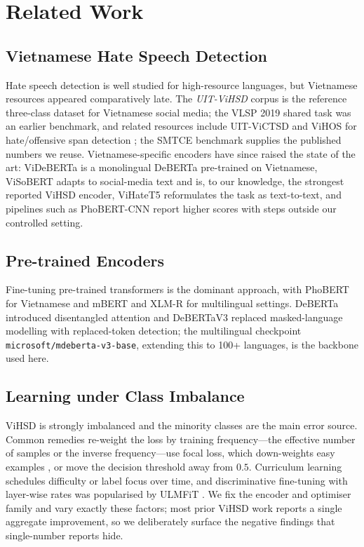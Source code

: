 \section{Related Work}
\label{sec:related}

\subsection{Vietnamese Hate Speech Detection}
Hate speech detection is well studied for high-resource languages, but Vietnamese
resources appeared comparatively late.  The \emph{UIT-ViHSD} corpus
\cite{luu2021vihsd} is the reference three-class dataset for Vietnamese social
media; the VLSP 2019 shared task \cite{vu2020hsdvlsp} was an earlier benchmark, and
related resources include UIT-ViCTSD \cite{nguyen2021victsd} and ViHOS for
hate/offensive span detection \cite{hoang2023vihos}; the SMTCE benchmark
\cite{nguyen2022smtce} supplies the published numbers we reuse.  Vietnamese-specific
encoders have since raised the state of the art: ViDeBERTa \cite{tran2023videberta}
is a monolingual DeBERTa pre-trained on Vietnamese, ViSoBERT
\cite{nguyen2023visobert} adapts to social-media text and is, to our knowledge, the
strongest reported ViHSD encoder, ViHateT5 \cite{nguyen2024vihatet5} reformulates
the task as text-to-text, and pipelines such as PhoBERT-CNN
\cite{tran2022phobertcnn} report higher scores with steps outside our controlled
setting.

\subsection{Pre-trained Encoders}
Fine-tuning pre-trained transformers is the dominant approach, with PhoBERT
\cite{nguyen2020phobert} for Vietnamese and mBERT \cite{devlin2019bert} and XLM-R
\cite{conneau2020xlmr} for multilingual settings.  DeBERTa \cite{he2021deberta}
introduced disentangled attention and DeBERTaV3 \cite{he2023debertav3} replaced
masked-language modelling with replaced-token detection; the multilingual
checkpoint \texttt{microsoft/mdeberta-v3-base}, extending this to 100+ languages,
is the backbone used here.

\subsection{Learning under Class Imbalance}
ViHSD is strongly imbalanced and the minority classes are the main error source.
Common remedies re-weight the loss by training frequency---the effective number of
samples \cite{cui2019classbalanced} or the inverse frequency---use focal loss,
which down-weights easy examples \cite{lin2017focal}, or move the decision threshold
away from $0.5$.  Curriculum learning \cite{bengio2009curriculum} schedules
difficulty or label focus over time, and discriminative fine-tuning with layer-wise
rates was popularised by ULMFiT \cite{howard2018ulmfit}.  We fix the encoder and
optimiser family and vary exactly these factors; most prior ViHSD work reports a
single aggregate improvement, so we deliberately surface the negative findings that
single-number reports hide.

